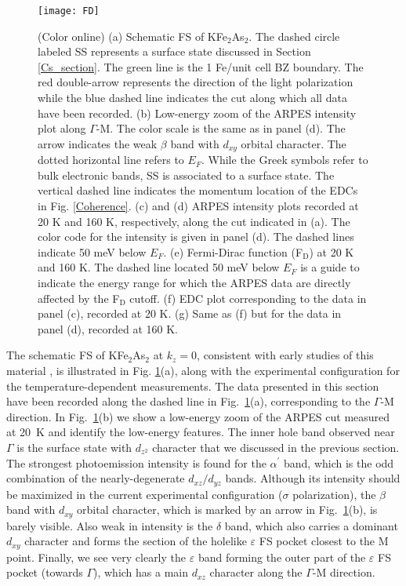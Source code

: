 \documentclass[twocolumn,aps,showpacs,preprintnumbers,amsmath,amssymb, superscriptaddress,longbibliography]{revtex4-1}
\begin{document}
\begin{figure}[!t]
\begin{center}
\texttt{[image: FD]}
\end{center}
\caption{\label{FD}(Color online) (a) Schematic FS of KFe$_2$As$_2$. The dashed circle labeled SS represents a surface state \cite{Yoshida_JCPS72} discussed in Section \ref{Cs_section}. The green line is the 1 Fe/unit cell BZ boundary. The red double-arrow represents the direction of the light polarization while the blue dashed line indicates the cut along which all data have been recorded. (b) Low-energy zoom of the ARPES intensity plot along $\Gamma$-M. The color scale is the same as in panel (d). The arrow indicates the weak $\beta$ band with $d_{xy}$ orbital character. The dotted horizontal line refers to $E_F$. While the Greek symbols refer to bulk electronic bands, SS is associated to a surface state. The vertical dashed line indicates the momentum location of the EDCs in Fig. \ref{Coherence}. (c) and (d) ARPES intensity plots recorded at 20 K and 160 K, respectively, along the cut indicated in (a). The color code for the intensity is given in panel (d). The dashed lines indicate 50 meV below $E_F$. (e) Fermi-Dirac function (F$_{\textrm{D}}$) at 20 K and 160 K. The dashed line located 50 meV below $E_F$ is a guide to indicate the energy range for which the ARPES data are directly affected by the F$_{\textrm{D}}$ cutoff. (f) EDC plot corresponding to the data in panel (c), recorded at 20 K. (g) Same as (f) but for the data in panel (d), recorded at 160 K.}
\end{figure}

The schematic FS of KFe$_2$As$_2$ at $k_z=0$, consistent with early studies of this material \cite{Sato_PRL2009,Yoshida_JCPS72}, is illustrated in Fig. \ref{FD}(a), along with the experimental configuration for the temperature-dependent measurements. The data presented in this section have been recorded along the dashed line in Fig.~\ref{FD}(a), corresponding to the $\Gamma$-M direction. In Fig.~\ref{FD}(b) we show a low-energy zoom of the ARPES cut measured at 20~K and identify the low-energy features. The inner hole band observed near $\Gamma$ is the surface state with $d_{z^2}$ character that we discussed in the previous section. The strongest photoemission intensity is found for the $\alpha^{\prime}$ band, which is the odd combination of the nearly-degenerate $d_{xz}/d_{yz}$ bands. Although its intensity should be maximized in the current experimental configuration ($\sigma$ polarization), the $\beta$ band with $d_{xy}$ orbital character, which is marked by an arrow in Fig.~\ref{FD}(b), is barely visible. Also weak in intensity is the $\delta$ band, which also carries a dominant $d_{xy}$ character and forms the section of the holelike $\varepsilon$ FS pocket closest to the M point. Finally, we see very clearly the $\varepsilon$ band forming the outer part of the $\varepsilon$ FS pocket (towards $\Gamma$), which has a main $d_{xz}$ character along the $\Gamma$-M direction.
\end{document}
